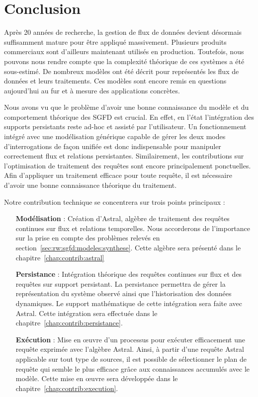 \section{Conclusion}
Après 20 années de recherche, la gestion de flux de données devient désormais suffisamment mature pour être appliqué massivement. Plusieurs produits commerciaux sont d'ailleurs maintenant utilisés en production. Toutefois, nous pouvons nous rendre compte que la complexité théorique de ces systèmes a été sous-estimé. De nombreux modèles ont été décrit pour représentés les flux de données et leurs traitements. Ces modèles sont encore remis en questions aujourd'hui au fur et à mesure des applications concrètes. 

Nous avons vu que le problème d'avoir une bonne connaissance du modèle et du comportement théorique des SGFD est crucial. En effet, en l'état l'intégration des supports persistants reste ad-hoc et assisté par l'utilisateur. Un fonctionnement intégré avec une modélisation générique capable de gérer les deux modes d'interrogations de façon unifiée est donc indispensable pour manipuler correctement flux et relations persistantes. Similairement, les contributions sur l'optimisation de traitement des requêtes sont encore principalement ponctuelles. Afin d'appliquer un traitement efficace pour toute requête, il est nécessaire d'avoir une bonne connaissance théorique du traitement.

Notre contribution technique se concentrera sur trois points principaux :
\begin{itemize}
 \item[\textbf{Modélisation}] : Création d'Astral, algèbre de traitement des requêtes continues sur flux et relations temporelles. Nous accorderons de l'importance sur la prise en compte des problèmes relevés en section~\ref{sec:rw:sgfd:modeles:synthese}. Cette algèbre sera présenté dans le chapitre~\ref{chap:contrib:astral}
 \item[\textbf{Persistance}] : Intégration théorique des requêtes continues sur flux et des requêtes sur support persistant. La persistance permettra de gérer la représentation du système observé ainsi que l'historisation des données dynamiques. Le support mathématique de cette intégration sera faite avec Astral. Cette intégration sera effectuée dans le chapitre~\ref{chap:contrib:persistance}.
 \item[\textbf{Exécution}] : Mise en œuvre d'un processus pour exécuter efficacement une requête exprimée avec l'algèbre Astral. Ainsi, à partir d'une requête Astral applicable sur tout type de sources, il est possible de sélectionner le plan de requête qui semble le plus efficace grâce aux connaissances accumulés avec le modèle. Cette mise en œuvre sera développée dans le chapitre~\ref{chap:contrib:execution}.
\end{itemize}

